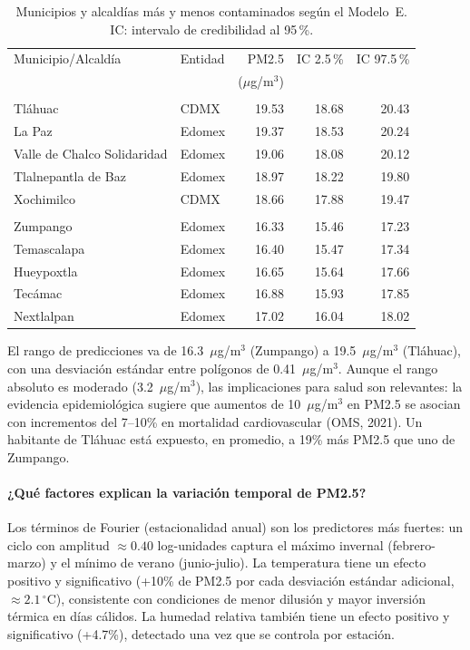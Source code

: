 \documentclass[12pt]{article}
\begin{document}
\begin{table}[H]
\centering
\caption{Municipios y alcald\'ias m\'as y menos contaminados seg\'un el Modelo~E.
         IC: intervalo de credibilidad al 95\,\%.}
\label{tab:prediccionE}
\small
\begin{tabular}{>{\raggedright\arraybackslash}p{5cm}>{\raggedright\arraybackslash}p{1.8cm}rrr}
\toprule
Municipio/Alcald\'ia & Entidad & PM2.5 & IC 2.5\,\% & IC 97.5\,\% \\
                     &         & ($\mu$g/m$^3$) & & \\
\midrule
\multicolumn{5}{l}{\textit{Zonas m\'as contaminadas}} \\
Tl\'ahuac            & CDMX   & 19.53 & 18.68 & 20.43 \\
La Paz               & Edomex & 19.37 & 18.53 & 20.24 \\
Valle de Chalco Solidaridad & Edomex & 19.06 & 18.08 & 20.12 \\
Tlalnepantla de Baz  & Edomex & 18.97 & 18.22 & 19.80 \\
Xochimilco           & CDMX   & 18.66 & 17.88 & 19.47 \\
\midrule
\multicolumn{5}{l}{\textit{Zonas menos contaminadas}} \\
Zumpango             & Edomex & 16.33 & 15.46 & 17.23 \\
Temascalapa          & Edomex & 16.40 & 15.47 & 17.34 \\
Hueypoxtla           & Edomex & 16.65 & 15.64 & 17.66 \\
Tec\'amac            & Edomex & 16.88 & 15.93 & 17.85 \\
Nextlalpan           & Edomex & 17.02 & 16.04 & 18.02 \\
\bottomrule
\end{tabular}
\normalsize
\end{table}

El rango de predicciones va de 16.3~$\mu$g/m$^3$ (Zumpango) a
19.5~$\mu$g/m$^3$ (Tl\'ahuac), con una desviaci\'on est\'andar entre
pol\'igonos de 0.41~$\mu$g/m$^3$.
Aunque el rango absoluto es moderado (3.2~$\mu$g/m$^3$), las implicaciones
para salud son relevantes: la evidencia epidemiol\'ogica sugiere que
aumentos de 10~$\mu$g/m$^3$ en PM2.5 se asocian con incrementos del
7--10\% en mortalidad cardiovascular (OMS, 2021).
Un habitante de Tl\'ahuac est\'a expuesto, en promedio, a 19\% m\'as
PM2.5 que uno de Zumpango.


\paragraph{¿Qu\'e factores explican la variaci\'on temporal de PM2.5?}
Los t\'erminos de Fourier (estacionalidad anual) son los predictores
m\'as fuertes: un ciclo con amplitud $\approx 0.40$ log-unidades captura
el m\'aximo invernal (febrero-marzo) y el m\'inimo de verano (junio-julio).
La temperatura tiene un efecto positivo y significativo
(+10\% de PM2.5 por cada desviaci\'on est\'andar adicional, $\approx 2.1\,^\circ$C),
consistente con condiciones de menor dilusi\'on y mayor inversi\'on
t\'ermica en d\'ias c\'alidos.
La humedad relativa tambi\'en tiene un efecto positivo y significativo
(+4.7\%), detectado una vez que se controla por estaci\'on.
\end{document}
